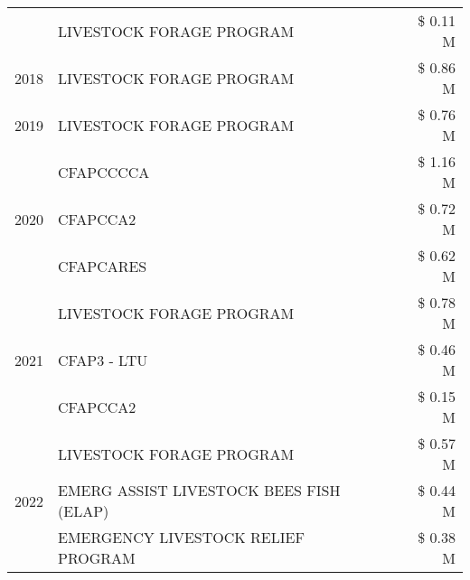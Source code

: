 \begin{tabular}{llr}
 & LIVESTOCK FORAGE PROGRAM & \$ 0.11 M \\
\cline{1-3}
2018 & LIVESTOCK FORAGE PROGRAM & \$ 0.86 M \\
\cline{1-3}
2019 & LIVESTOCK FORAGE PROGRAM & \$ 0.76 M \\
\cline{1-3}
\multirow[t]{3}{*}{2020} & CFAPCCCCA & \$ 1.16 M \\
 & CFAPCCA2 & \$ 0.72 M \\
 & CFAPCARES & \$ 0.62 M \\
\cline{1-3}
\multirow[t]{3}{*}{2021} & LIVESTOCK FORAGE PROGRAM & \$ 0.78 M \\
 & CFAP3 - LTU & \$ 0.46 M \\
 & CFAPCCA2 & \$ 0.15 M \\
\cline{1-3}
\multirow[t]{3}{*}{2022} & LIVESTOCK FORAGE PROGRAM & \$ 0.57 M \\
 & EMERG ASSIST LIVESTOCK BEES FISH (ELAP) & \$ 0.44 M \\
 & EMERGENCY LIVESTOCK RELIEF PROGRAM & \$ 0.38 M \\
\cline{1-3}
\bottomrule
\end{tabular}
